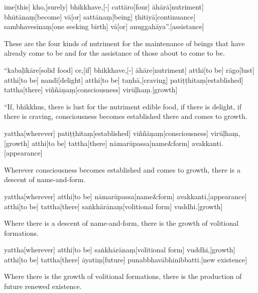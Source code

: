 \begin{samepage}
\begingl[glneveryline={\PaliGlossA,\PaliGlossB}]
ime[this] kho,[surely] bhikkhave,[-] cattāro[four] āhārā[nutriment] bhūtānaṃ[become] vā[or] sattānaṃ[being] ṭhitiyā[continuance] sambhavesīnaṃ[one seeking birth] vā[or] anuggahāya”.[assistance]
\endgl
\nopagebreak
\linespread{0.5}
\begin{spacin}{0.2}
{\PaliGlossFT These are the four kinds of nutriment for the maintenance of beings that have already come to be and for the assistance of those about to come to be.}
\end{spacin}
\vskip 12pt
\end{samepage}
\vskip 0.2in
\begin{samepage}
\begingl[glneveryline={\PaliGlossA,\PaliGlossB}]
“kabaḷīkāre[solid food] ce,[if] bhikkhave,[-] āhāre[nutriment] atthi[to be] rāgo[lust] atthi[to be] nandī[delight] atthi[to be] taṇhā,[craving] patiṭṭhitaṃ[established] tattha[there] viññāṇaṃ[consciousness] virūḷhaṃ.[growth]
\endgl
\nopagebreak
\linespread{0.5}
\begin{spacin}{0.2}
{\PaliGlossFT “If, bhikkhus, there is lust for the nutriment edible food, if there is delight, if there is craving, consciousness becomes established there and comes to growth.}
\end{spacin}
\vskip 12pt
\end{samepage}
\begin{samepage}
\begingl[glneveryline={\PaliGlossA,\PaliGlossB}]
yattha[wherever] patiṭṭhitaṃ[established] viññāṇaṃ[consciousness] virūḷhaṃ,[growth] atthi[to be] tattha[there] nāmarūpassa[name\&form] avakkanti.[appearance]
\endgl
\nopagebreak
\linespread{0.5}
\begin{spacin}{0.2}
{\PaliGlossFT Wherever consciousness becomes established and comes to growth, there is a descent of name-and-form.}
\end{spacin}
\vskip 12pt
\end{samepage}
\begin{samepage}
\begingl[glneveryline={\PaliGlossA,\PaliGlossB}]
yattha[wherever] atthi[to be] nāmarūpassa[name\&form] avakkanti,[appearance] atthi[to be] tattha[there] saṅkhārānaṃ[volitional form] vuddhi.[growth]
\endgl
\nopagebreak
\linespread{0.5}
\begin{spacin}{0.2}
{\PaliGlossFT Where there is a descent of name-and-form, there is the growth of volitional formations.}
\end{spacin}
\vskip 12pt
\end{samepage}
\begin{samepage}
\begingl[glneveryline={\PaliGlossA,\PaliGlossB}]
yattha[wherever] atthi[to be] saṅkhārānaṃ[volitional form] vuddhi,[growth] atthi[to be] tattha[there] āyatiṃ[future] punabbhavābhinibbatti.[new existence]
\endgl
\nopagebreak
\linespread{0.5}
\begin{spacin}{0.2}
{\PaliGlossFT Where there is the growth of volitional formations, there is the production of future renewed existence.}
\end{spacin}
\vskip 12pt
\end{samepage}
